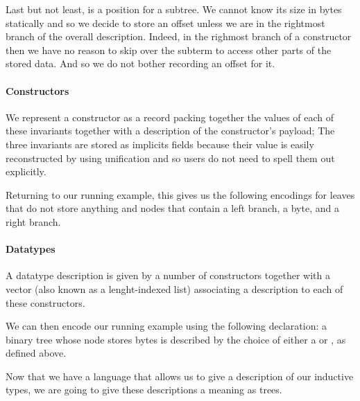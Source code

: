 Last but not least,  is a position for a subtree.
We cannot know its size in bytes statically and so we decide to store
an offset unless we are in the rightmost branch of the overall description.
%
Indeed, in the righmost branch of a constructor then we have no reason to
skip over the subterm to access other parts of the stored data. And so we
do not bother recording an offset for it.


\paragraph{Constructors}
We represent a constructor as a record packing together the values of each
of these invariants together with a description of the constructor's payload;
The three invariants are stored as implicits fields because their value is
easily reconstructed by \idris{} using unification and so users do not need
to spell them out explicitly.


Returning to our running example, this gives us the following encodings for
leaves that do not store anything
and nodes that contain a left branch, a byte, and a right branch.



\paragraph{Datatypes}
A datatype description is given by a number of constructors together with
a vector (also known as a lenght-indexed list) associating a description
to each of these constructors.


We can then encode our running example using the following 
declaration: a binary tree whose node stores bytes is described by the choice
of either a  or , as defined above.


Now that we have a language that allows us to give a description of our
inductive types, we are going to give these descriptions a meaning as trees.
